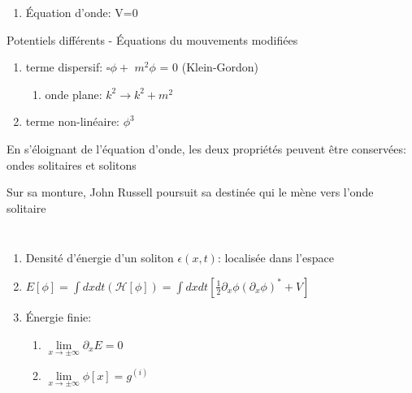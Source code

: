 \documentclass[handout]{beamer}
\begin{document}
\begin{frame}
\begin{enumerate}
\item Équation d'onde: V=0
\end{enumerate}

\begin{block}{Potentiels différents - Équations du mouvements modifiées}
\begin{enumerate}

\item terme dispersif: $\square\phi +$ \boldmath $m^2 \phi $ \unboldmath  = 0 (Klein-Gordon)\\
\begin{enumerate}
\item onde plane: $k^2 \rightarrow k^2+m^2$

\end{enumerate}
\item terme non-linéaire: $\phi^3$ \\
\end{enumerate}
\end{block}
En s'éloignant de l'équation d'onde, les deux propriétés peuvent être conservées: ondes solitaires et solitons 

\end{frame}

\begin{frame}
Sur sa monture, John Russell poursuit sa destinée qui le mène vers l'onde solitaire
\begin{columns}
    \begin{column}{.5\linewidth}
   \begin{figure}[0.3\textwidth]
    \end{figure}
    \end{column}
    \begin{column}{.5\linewidth}
    \begin{figure}[0.3\textwidth]
    \end{figure}
    \end{column}
  \end{columns}
\end{frame}


\begin{frame}
	\begin{enumerate}
	\item Densité d'énergie d'un soliton $\epsilon(x,t)$: localisée dans l'espace
	\item $E[\phi] = \int{dxdt (\mathcal{H}[\phi])} = \int{dxdt [\frac{1}{2} \partial_x \phi (\partial_x \phi)^* +V]}$
	\item Énergie finie:
	\begin{enumerate}
	\item  $\lim\limits_{x \to \pm\infty}\partial_x E =0$
	\item  $\lim\limits_{x \to \pm\infty} \phi[x] = g^{(i)}$	
	\end{enumerate}	
	\end{enumerate} 
\end{frame}
\end{document}
